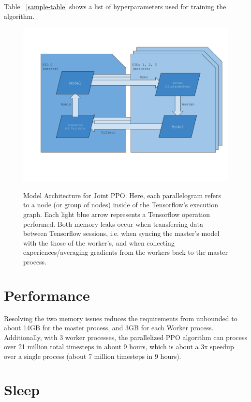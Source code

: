 \documentclass{article}
\begin{document}
Table ~\ref{sample-table} shows a list of hyperparameters used for training the algorithm.

\begin{figure}[htbp]
  \centering
  \includegraphics[width=\columnwidth]{graph.png}
  \label{fig:graph}
  \caption{Model Architecture for Joint PPO. Here, each parallelogram refers to a node (or group of nodes) inside of the Tensorflow's execution graph. Each light blue arrow represents a Tensorflow operation performed. Both memory leaks occur when transferring data between Tensorflow sessions, i.e. when syncing the master's model with the those of the worker's, and when collecting experiences/averaging gradients from the workers back to the master process.}
\end{figure}

\section{Performance}

Resolving the two memory issues reduces the requirements from unbounded to about 14GB for the master process, and 3GB for each Worker process. Additionally, with 3 worker processes, the parallelized PPO algorithm can process over 21 million total timesteps in about 9 hours, which is about a 3x speedup over a single process (about 7 million timesteps in 9 hours). 

\section{Sleep}
\end{document}
